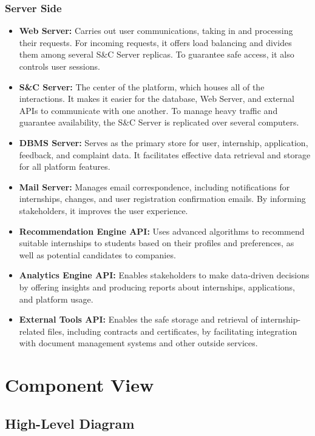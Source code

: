 \subsubsection{Server Side}
\begin{itemize}
    \item \textbf{Web Server:} Carries out user communications, taking in and processing their requests. For incoming requests, it offers load balancing and divides them among several S\&C Server replicas. To guarantee safe access, it also controls user sessions.
    \item \textbf{S\&C Server:} The center of the platform, which houses all of the interactions. It makes it easier for the database, Web Server, and external APIs to communicate with one another. To manage heavy traffic and guarantee availability, the S\&C Server is replicated over several computers.
    \item \textbf{DBMS Server:} Serves as the primary store for user, internship, application, feedback, and complaint data. It facilitates effective data retrieval and storage for all platform features.
    \item \textbf{Mail Server:} Manages email correspondence, including notifications for internships, changes, and user registration confirmation emails. By informing stakeholders, it improves the user experience.
    \item \textbf{Recommendation Engine API:} Uses advanced algorithms to recommend suitable internships to students based on their profiles and preferences, as well as potential candidates to companies.
    \item \textbf{Analytics Engine API:} Enables stakeholders to make data-driven decisions by offering insights and producing reports about internships, applications, and platform usage.
    \item \textbf{External Tools API:} Enables the safe storage and retrieval of internship-related files, including contracts and certificates, by facilitating integration with document management systems and other outside services.
\end{itemize}

\newpage

\section{Component View}
\label{subsec:component_view}

\subsection{High-Level Diagram}
\label{subsubsec:high_level_diagram}

